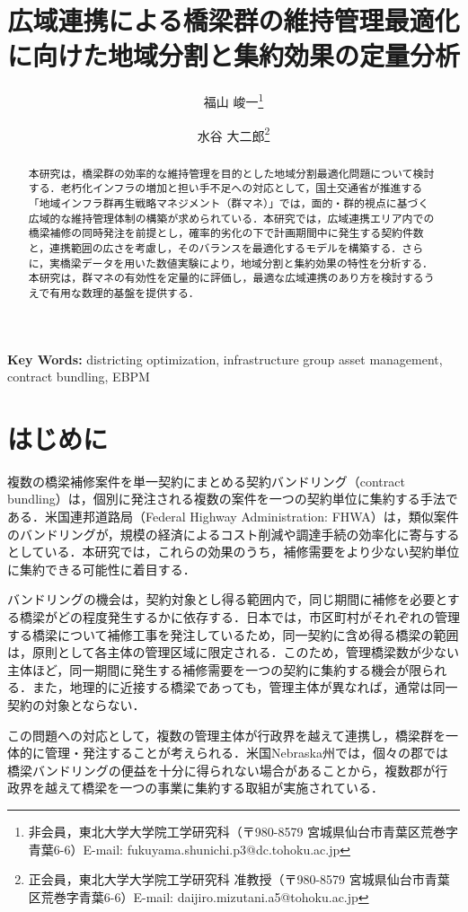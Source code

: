 \documentclass[Journal,letterpaper,InsideFigs,NoLineNumbers]{ascelike-new}
\title{広域連携による橋梁群の維持管理最適化に向けた地域分割と集約効果の定量分析}
\author{
福山 峻一\thanks{非会員，東北大学大学院工学研究科（〒980-8579 宮城県仙台市青葉区荒巻字青葉6-6）E-mail: fukuyama.shunichi.p3@dc.tohoku.ac.jp}
\and
水谷 大二郎\thanks{正会員，東北大学大学院工学研究科 准教授（〒980-8579 宮城県仙台市青葉区荒巻字青葉6-6）E-mail: daijiro.mizutani.a5@tohoku.ac.jp}
}
\begin{document}
\maketitle

\begin{abstract}
本研究は，橋梁群の効率的な維持管理を目的とした地域分割最適化問題について検討する．老朽化インフラの増加と担い手不足への対応として，国土交通省が推進する「地域インフラ群再生戦略マネジメント（群マネ）」では，面的・群的視点に基づく広域的な維持管理体制の構築が求められている．本研究では，広域連携エリア内での橋梁補修の同時発注を前提とし，確率的劣化の下で計画期間中に発生する契約件数と，連携範囲の広さを考慮し，そのバランスを最適化するモデルを構築する．さらに，実橋梁データを用いた数値実験により，地域分割と集約効果の特性を分析する．本研究は，群マネの有効性を定量的に評価し，最適な広域連携のあり方を検討するうえで有用な数理的基盤を提供する．
\end{abstract}

\begin{center}
\textbf{Key Words:} districting optimization, infrastructure group asset management, contract bundling, EBPM
\end{center}

\section{はじめに}

複数の橋梁補修案件を単一契約にまとめる契約バンドリング（contract bundling）は，個別に発注される複数の案件を一つの契約単位に集約する手法である．米国連邦道路局（Federal Highway Administration: FHWA）は，類似案件のバンドリングが，規模の経済によるコスト削減や調達手続の効率化に寄与するとしている\cite{fhwafactsheet}．本研究では，これらの効果のうち，補修需要をより少ない契約単位に集約できる可能性に着目する．

バンドリングの機会は，契約対象とし得る範囲内で，同じ期間に補修を必要とする橋梁がどの程度発生するかに依存する．日本では，市区町村がそれぞれの管理する橋梁について補修工事を発注しているため，同一契約に含め得る橋梁の範囲は，原則として各主体の管理区域に限定される．このため，管理橋梁数が少ない主体ほど，同一期間に発生する補修需要を一つの契約に集約する機会が限られる．また，地理的に近接する橋梁であっても，管理主体が異なれば，通常は同一契約の対象とならない．

この問題への対応として，複数の管理主体が行政界を越えて連携し，橋梁群を一体的に管理・発注することが考えられる．米国Nebraska州では，個々の郡では橋梁バンドリングの便益を十分に得られない場合があることから，複数郡が行政界を越えて橋梁を一つの事業に集約する取組が実施されている\cite{fhwa2019}．
\end{document}
